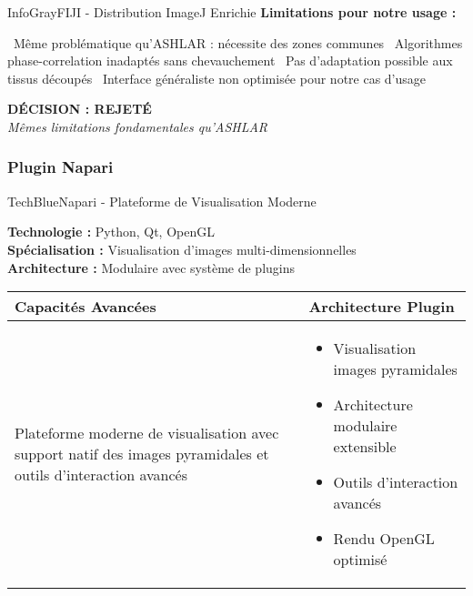 \documentclass[12pt,a4paper]{report}
\newcommand{\con}[1]{\textcolor{DangerRed}{\faTimes\ #1}}
\begin{document}
\begin{}
\begin{}
\begin{}
\begin{techbox}{InfoGray}{FIJI - Distribution ImageJ Enrichie}
\textbf{Limitations pour notre usage :}
\begin{itemize}[leftmargin=*]
    \con{Même problématique qu'ASHLAR : nécessite des zones communes}
    \con{Algorithmes phase-correlation inadaptés sans chevauchement}
    \con{Pas d'adaptation possible aux tissus découpés}
    \con{Interface généraliste non optimisée pour notre cas d'usage}
\end{itemize}

\begin{center}
\textbf{\textcolor{DangerRed}{DÉCISION : REJETÉ}}\\
\textit{Mêmes limitations fondamentales qu'ASHLAR}
\end{center}

\end{techbox}

\subsubsection{Plugin Napari}

\begin{techbox}{TechBlue}{Napari - Plateforme de Visualisation Moderne}

\textbf{Technologie :} Python, Qt, OpenGL \\
\textbf{Spécialisation :} Visualisation d'images multi-dimensionnelles \\
\textbf{Architecture :} Modulaire avec système de plugins

\vspace{0.5cm}

\begin{tabularx}{\textwidth}{|X|X|}
\hline
\rowcolor{LightGray}
\textbf{Capacités Avancées} & \textbf{Architecture Plugin} \\
\hline
Plateforme moderne de visualisation avec support natif des images pyramidales et outils d'interaction avancés &
\begin{itemize}[nosep]
\item Visualisation images pyramidales
\item Architecture modulaire extensible
\item Outils d'interaction avancés
\item Rendu OpenGL optimisé
\end{itemize} \\
\hline
\end{tabularx}

\vspace{0.5cm}


\end{techbox}
\end{}
\end{}
\end{}
\end{document}
